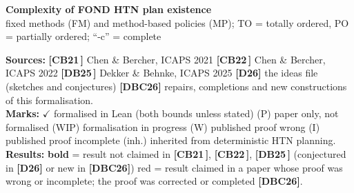 \documentclass[10pt]{article}
\newcommand{\CBa}[1]{\textcolor{cbA}{\textbf{[CB21}\if\relax\detokenize{#1}\relax\else\,#1\fi\textbf{]}}}
\newcommand{\CBb}[1]{\textcolor{cbB}{\textbf{[CB22}\if\relax\detokenize{#1}\relax\else\,#1\fi\textbf{]}}}
\newcommand{\DBc}[1]{\textcolor{dbC}{\textbf{[DB25}\if\relax\detokenize{#1}\relax\else\,#1\fi\textbf{]}}}
\newcommand{\Dd}[1]{\textcolor{dD}{\textbf{[D26}#1\textbf{]}}}
\newcommand{\DBC}[1]{\textcolor{dbc}{\textbf{[DBC26}#1\textbf{]}}}
\newcommand{\ok}{\ensuremath{\checkmark}}
\newcommand{\Pp}{(P)}
\newcommand{\W}{(W)}
\newcommand{\I}{(I)}
\newcommand{\wip}{(WIP)}
\newcommand{\inh}{(inh.)}
\newcommand{\New}[1]{\textbf{#1}}           %
\newcommand{\Cor}[1]{\textcolor{corr}{#1}} %
\begin{document}
\pagestyle{empty}

\begin{center}
{\large\bfseries Complexity of FOND HTN plan existence}\\[2pt]
\small fixed methods (FM) and method-based policies (MP); TO = totally ordered, PO = partially ordered; ``-c'' = complete
\end{center}

\noindent\footnotesize
\textbf{Sources:}
\CBa{} Chen \& Bercher, ICAPS 2021 \quad
\CBb{} Chen \& Bercher, ICAPS 2022 \quad
\DBc{} Dekker \& Behnke, ICAPS 2025 \quad
\Dd{} the ideas file (sketches and conjectures) \quad
\DBC{} repairs, completions and new constructions of this formalisation.\\[2pt]
\textbf{Marks:} \ok{} formalised in Lean (both bounds unless stated) \quad
\Pp{} paper only, not formalised \quad
\wip{} formalisation in progress \quad
\W{} published proof wrong \quad
\I{} published proof incomplete \quad
\inh{} inherited from deterministic HTN planning.
\\ \textbf{Results:} \New{bold} = result not claimed in \CBa{}, \CBb{}, \DBc{} (conjectured in \Dd{} or new in \DBC{}) \quad \Cor{red} = result claimed in a paper whose proof was wrong or incomplete; the proof was corrected or completed \DBC{}.
\end{document}
